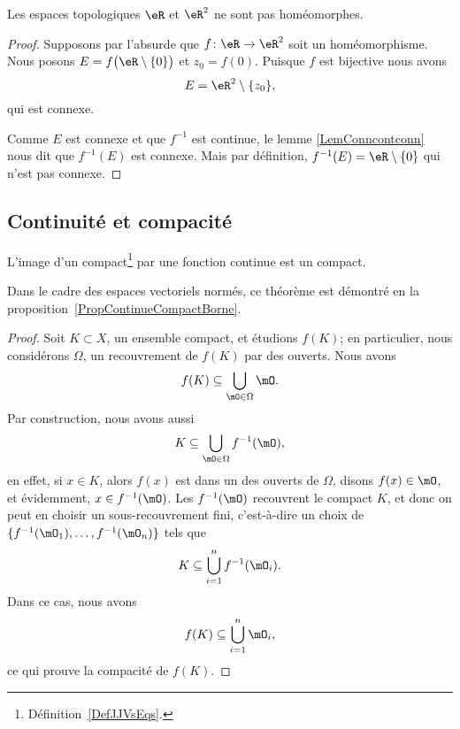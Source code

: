 \begin{example}
	Les espaces topologiques \( \eR\) et \( \eR^2\) ne sont pas homéomorphes.
\end{example}

\begin{proof}
	Supposons par l'absurde que \( f\colon \eR\to \eR^2\) soit un  homéomorphisme. Nous posons \( E=f\big( \eR\setminus\{ 0 \} \big)\) et \( z_0=f(0)\). Puisque \( f\) est bijective nous avons
	\begin{equation}
		E=\eR^2\setminus\{ z_0 \},
	\end{equation}
	qui est connexe.

	Comme \( E\) est connexe et que \( f^{-1}\) est continue, le lemme \ref{LemConncontconn} nous dit que \( f^{-1}(E)\) est connexe. Mais par définition, \( f^{-1}(E)=\eR\setminus\{ 0 \}\) qui n'est pas connexe.
\end{proof}

\subsection{Continuité et compacité}

\begin{theorem}     \label{ThoImCompCotComp}
	L'image d'un compact\footnote{Définition~\ref{DefJJVsEqs}.} par une fonction continue est un compact.
\end{theorem}
Dans le cadre des espaces vectoriels normés, ce théorème est démontré en la proposition~\ref{PropContinueCompactBorne}.

\begin{proof}
	Soit \( K\subset X\), un ensemble compact, et étudions \( f(K)\); en particulier, nous considérons \( \Omega\), un recouvrement de \( f(K)\) par des ouverts. Nous avons
	\begin{equation}
		f(K)\subseteq\bigcup_{\mO\in\Omega}\mO.
	\end{equation}
	Par construction, nous avons aussi
	\begin{equation}
		K\subseteq\bigcup_{\mO\in\Omega}f^{-1}(\mO),
	\end{equation}
	en effet, si \( x\in K\), alors \( f(x)\) est dans un des ouverts de \( \Omega\), disons \( f(x)\in \mO\), et évidemment, \( x\in f^{-1}(\mO)\).  Les \( f^{-1}(\mO)\) recouvrent le compact \( K\), et donc on peut en choisir un sous-recouvrement fini, c'est-à-dire un choix de \( \{ f^{-1}(\mO_1),\ldots,f^{-1}(\mO_n) \}\) tels que
	\begin{equation}
		K\subseteq \bigcup_{i=1}^nf^{-1}(\mO_i).
	\end{equation}
	Dans ce cas, nous avons
	\begin{equation}
		f(K)\subseteq\bigcup_{i=1}^n\mO_i,
	\end{equation}
	ce qui prouve la compacité de \( f(K)\).
\end{proof}


